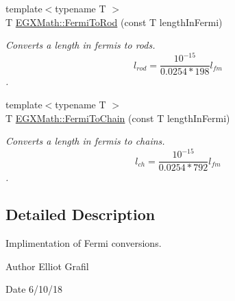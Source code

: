 \begin{DoxyCompactItemize}
{\footnotesize template$<$typename T $>$ }\\T \mbox{\hyperlink{group___e_g_x_math-_conversions-_length_conversions-_non-_s_i-_fermi-_surveyors_ga45d5bb796dd61d3b2f81d45dafbc682d}{E\+G\+X\+Math\+::\+Fermi\+To\+Rod}} (const T length\+In\+Fermi)
\begin{DoxyCompactList}\small\item\em Converts a length in fermis to rods. \[ l_{rod}= \frac{10^{-15}}{0.0254 * 198} l_{fm} \]. \end{DoxyCompactList}\item 
{\footnotesize template$<$typename T $>$ }\\T \mbox{\hyperlink{group___e_g_x_math-_conversions-_length_conversions-_non-_s_i-_fermi-_surveyors_ga0c8f626fae443871df52f72a4b361a60}{E\+G\+X\+Math\+::\+Fermi\+To\+Chain}} (const T length\+In\+Fermi)
\begin{DoxyCompactList}\small\item\em Converts a length in fermis to chains. \[ l_{ch}= \frac{10^{-15}}{0.0254 * 792} l_{fm} \]. \end{DoxyCompactList}\end{DoxyCompactItemize}


\subsection{Detailed Description}
Implimentation of Fermi conversions. 

\begin{DoxyAuthor}{Author}
Elliot Grafil 
\end{DoxyAuthor}
\begin{DoxyDate}{Date}
6/10/18 
\end{DoxyDate}

